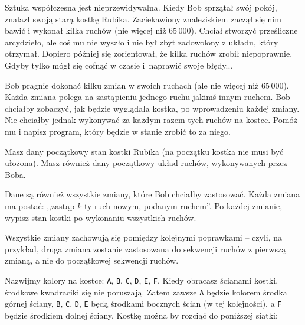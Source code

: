 

\usepackage[utf8]{inputenc}
\usepackage[T1]{fontenc}
\usepackage[polish]{babel}
\usepackage{polski}





Sztuka współczesna jest nieprzewidywalna.
Kiedy Bob sprzątał swój pokój, znalazł swoją starą kostkę Rubika.
Zaciekawiony znaleziskiem zaczął się nim bawić i wykonał kilka ruchów (nie więcej niż $65\,000$).
Chciał stworzyć prześliczne arcydzieło, ale coś mu nie wyszło i nie był zbyt zadowolony z układu, który otrzymał.
Dopiero później się zorientował, że kilka ruchów zrobił niepoprawnie.
Gdyby tylko mógł się cofnąć w czasie i~naprawić swoje błędy...

Bob pragnie dokonać kilku zmian w swoich ruchach (ale nie więcej niż $65\,000$).
Każda zmiana polega na zastąpieniu jednego ruchu jakimś innym ruchem.
Bob chciałby zobaczyć, jak będzie wyglądała kostka, po wprowadzeniu każdej zmiany.
Nie chciałby jednak wykonywać za każdym razem tych ruchów na kostce.
Pomóż mu i napisz program, który będzie w stanie zrobić to za niego.


Masz dany początkowy stan kostki Rubika (na początku kostka nie musi być ułożona).
Masz również dany początkowy układ ruchów, wykonywanych przez Boba.

Dane są również wszystkie zmiany, które Bob chciałby zastosować.
Każda zmiana ma postać: ,,zastąp $k$-ty ruch nowym, podanym ruchem''.
Po każdej zmianie, wypisz stan kostki po wykonaniu wszystkich ruchów.

Wszystkie zmiany zachowują się pomiędzy kolejnymi poprawkami
	-- czyli, na przykład, druga zmiana zostanie zastosowana do sekwencji ruchów
	z pierwszą zmianą, a nie do początkowej sekwencji ruchów.


Nazwijmy kolory na kostce: \texttt{A}, \texttt{B}, \texttt{C}, \texttt{D}, \texttt{E}, \texttt{F}.
Kiedy obracasz ścianami kostki, środkowe kwadraciki się nie poruszają.
Zatem zawsze \texttt{A} będzie kolorem środka górnej ściany, \texttt{B}, \texttt{C}, \texttt{D}, \texttt{E}
	będą środkami bocznych ścian (w tej kolejności), a \texttt{F} będzie środkiem dolnej ściany.
Kostkę można by rozciąć do poniższej siatki:

